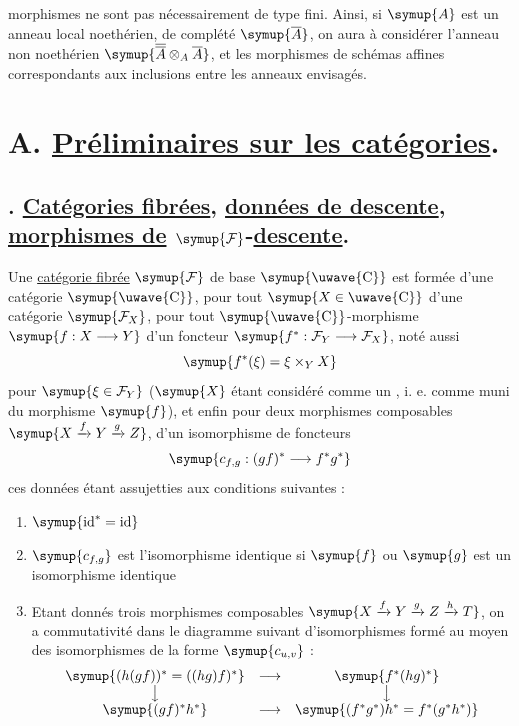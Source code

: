 morphismes ne sont pas nécessairement de type fini. Ainsi, si $\symup{A}$ est un anneau
local noethérien, de complété $\symup{\overline A}$, on aura à considérer l'anneau non
noethérien $\symup{\overline{\overline A}\otimes_A\overline A}$, et les morphismes de schémas affines
correspondants aux inclusions entre les anneaux envisagés.

\section*{\normalfont A. \uline{Préliminaires sur les catégories}.}

\subsection*{. \uline{Catégories fibrées}, \uline{données de descente}, \uline{morphismes de} $\symup{\mathcal F}$-\uline{descente}.}

 Une \uline{catégorie fibrée} $\symup{\mathcal F}$ de base
$\symup{\text{\uwave{C}}}$ est formée d'une catégorie $\symup{\text{\uwave{C}}}$, pour tout
$\symup{X\in\text{\uwave{C}}}$ d'une catégorie $\symup{\mathcal F_X}$, pour tout
$\symup{\text{\uwave{C}}}$-morphisme $\symup{f:X\longrightarrow Y}$ d'un foncteur
$\symup{f^*:\mathcal F_Y\longrightarrow\mathcal F_X}$, noté aussi
\[
  \symup{f^*(\xi)=\xi\times_Y X}
\]
pour $\symup{\xi\in\mathcal F_Y}$ ($\symup{X}$ étant considéré comme un , i. e. comme muni du morphisme $\symup{f}$), et enfin pour deux morphismes composables
$\symup{X\xrightarrow{f}Y\xrightarrow{g}Z}$, d'un isomorphisme de foncteurs
\[
  \symup{c_{f,g}:(gf)^*\longrightarrow f^*g^*}
\]
ces données étant assujetties aux conditions suivantes :

\begin{enumerate}
\item[\textnormal{(i)}] $\symup{\operatorname{id}^*=\operatorname{id}}$
\item[\textnormal{(ii)}] $\symup{c_{f,g}}$ est l'isomorphisme identique si $\symup{f}$ ou $\symup{g}$ est un
isomorphisme identique
\item[\textnormal{(iii)}] Etant donnés trois morphismes composables
$\symup{X\xrightarrow{f}Y\xrightarrow{g}Z\xrightarrow{h}T}$, on a commutativité dans
le diagramme suivant d'isomorphismes formé au moyen des isomorphismes de la
forme $\symup{c_{u,v}}$ :
\[
\begin{array}{ccc}
  \symup{(h(gf))^*=((hg)f)^*} & \longrightarrow & \symup{f^*(hg)^*} \\
  \big\downarrow && \big\downarrow \\
  \symup{(gf)^*h^*} & \longrightarrow & \symup{(f^*g^*)h^*=f^*(g^*h^*)}
\end{array}
\]
\end{enumerate}

